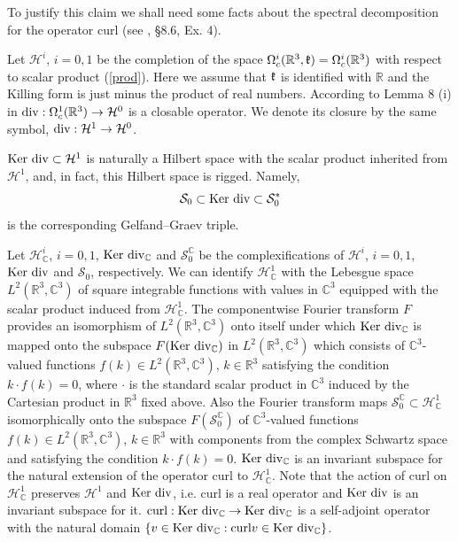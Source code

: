 \documentclass{amsart}
\begin{document}
To justify this claim we shall need some facts about the spectral decomposition for the operator curl (see \cite{BS3}, \S 8.6, Ex. 4). 

Let $\mathcal{H}^i$, $i=0,1$ be the completion of the space $\Omega^i_c(\mathbb{R}^3,\mathfrak k)=\Omega^i_c(\mathbb{R}^3)$ with respect to scalar product (\ref{prod}). Here we assume that $\mathfrak k$ is identified with $\mathbb{R}$ and the Killing form is just minus the product of real numbers. According to Lemma 8 (i) in \cite{SS} ${\rm div}: \Omega^1_c(\mathbb{R}^3)\rightarrow \mathcal{H}^0$ is a closable operator. We denote its closure by the same symbol, ${\rm div}: \mathcal{H}^1\rightarrow \mathcal{H}^0$. 

${\rm Ker~div}\subset \mathcal{H}^1$ is naturally a Hilbert space with the scalar product inherited from $\mathcal{H}^1$, and, in fact, this Hilbert space is rigged. Namely,
\begin{equation}\label{GG}
\mathcal{S}_0\subset {\rm Ker~div}\subset \mathcal{S}_0^*
\end{equation}
is the corresponding Gelfand--Graev triple.

Let $\mathcal{H}^i_{\mathbb{C}}$, $i=0,1$, ${\rm Ker~div}_{\mathbb{C}}$ and $\mathcal{S}_0^{\mathbb{C}}$ be the complexifications of $\mathcal{H}^i$, $i=0,1$, ${\rm Ker~div}$ and $\mathcal{S}_0$, respectively.  We can identify $\mathcal{H}^1_{\mathbb{C}}$ with the Lebesgue space $L^2(\mathbb{R}^3,\mathbb{C}^3)$ of square integrable functions with values in $\mathbb{C}^3$ equipped with the scalar product induced from $\mathcal{H}^1_{\mathbb{C}}$. The componentwise Fourier transform $F$ provides an isomorphism of $L^2(\mathbb{R}^3,\mathbb{C}^3)$ onto itself under which ${\rm Ker~div}_{\mathbb{C}}$ is mapped onto the subspace $F({\rm Ker~div}_{\mathbb{C}})$ in $L^2(\mathbb{R}^3,\mathbb{C}^3)$ which consists of $\mathbb{C}^3$-valued functions $f(k)\in L^2(\mathbb{R}^3,\mathbb{C}^3)$, $k\in \mathbb{R}^3$ satisfying the condition $k\cdot f(k)=0$, where $\cdot$ is the standard scalar product in $\mathbb{C}^3$ induced by the Cartesian product in $\mathbb{R}^3$ fixed above. Also the Fourier transform maps $\mathcal{S}_0^{\mathbb{C}}\subset \mathcal{H}^1_{\mathbb{C}}$ isomorphically onto the subspace $F(\mathcal{S}_0^{\mathbb{C}})$ of $\mathbb{C}^3$-valued functions $f(k)\in L^2(\mathbb{R}^3,\mathbb{C}^3)$, $k\in \mathbb{R}^3$ with components from the complex Schwartz space and satisfying the condition $k\cdot f(k)=0$. ${\rm Ker~div}_{\mathbb{C}}$ is an invariant subspace for the natural extension of the operator curl to $\mathcal{H}^1_{\mathbb{C}}$. Note that the action of curl on $\mathcal{H}^1_{\mathbb{C}}$ preserves $\mathcal{H}^1$ and ${\rm Ker~div}$, i.e. curl is a real operator and ${\rm Ker~div}$ is an invariant subspace for it. ${\rm curl}: {\rm Ker~div}_{\mathbb{C}}\rightarrow {\rm Ker~div}_{\mathbb{C}}$ is a self-adjoint operator with the natural domain $\{v\in {\rm Ker~div}_{\mathbb{C}}:{\rm curl}v\in {\rm Ker~div}_{\mathbb{C}}\}$.
\end{document}
